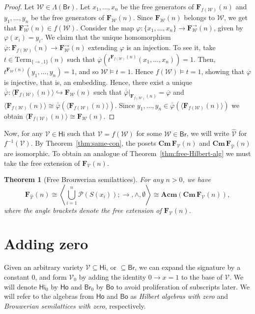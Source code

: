 \documentclass{amsart}
\newtheorem{theorem}{Theorem}[section]
\newcommand{\alg}[1]{\mathbf{#1}}
\newcommand{\var}[1]{\mathsf{#1}}
\newcommand{\FV}{\alg{F}_\mathcal{V}}
\newcommand{\FW}{\alg{F}_\mathcal{W}}
\newcommand{\FVhat}{\alg{F}_{\widehat{\mathcal{V}}}}
\newcommand{\Cm}[1]{\mathbf{Cm}\, #1}
\def\ra{\rightarrow}
\def\pw{\mathscr{P}}
\begin{document}
\begin{proof}
Let $\mathcal{W}\in\Lambda(\var{Br})$. Let $x_1,\dots,x_n$ be the free
generators of $\alg{F}_{f(\mathcal{W})}(n)$ and $y_1,\dots,y_n$ be the free
generators of $\FW(n)$. Since $\FW(n)$ belongs to
$\mathcal{W}$, we get that $\FW^\ra(n)\in f(\mathcal{W})$.
Consider the map
$\varphi\colon \{x_1,\dots,x_n\}\to \FW^\ra(n)$, given by
$\varphi(x_i) = y_i$. We claim that the unique homomorphism
$\overline{\varphi}\colon \alg{F}_{f(\mathcal{W})}(n)\to \FW^\ra(n)$ extending
$\varphi$ is an injection. To see it, take $t\in \mathrm{Term}_{\{\ra,1\}}(n)$
such that $\overline{\varphi}(t^{\alg{F}_{f(\mathcal{W})}(n)}(x_1,\dots,x_n)) = 1$.
Then, $t^{\FW(n)}(y_1,\dots,y_n) = 1$, and so
$\mathcal{W}\models t =1$. Hence $f(\mathcal{W})\models t =1$, showing
that $\overline{\varphi}$ is injective, that is, an embedding.
Hence, there exist a unique
$\overline{\overline{\varphi}}\colon
\langle \alg{F}_{f(\mathcal{W})}(n) \rangle \hookrightarrow \FW(n)$
such that $\overline{\overline{\varphi}}|_{\alg{F}_{f(\mathcal{W})}(n)} =
\overline{\varphi}$ and
$\langle \alg{F}_{f(\mathcal{W})}(n) \rangle \cong
\overline{\overline{\varphi}}(\langle \alg{F}_{f(\mathcal{W})}(n) \rangle)$.
Since $y_1,\dots, y_n\in \overline{\overline{\varphi}}(\langle
\alg{F}_{f(\mathcal{W})}(n) \rangle)$ we obtain
$\langle \alg{F}_{f(\mathcal{W})}(n)\rangle \cong
\FW(n)$. 
\end{proof}  


Now, for any $\mathcal{V}\in\var{Hi}$ such that
$\mathcal{V} = f(\mathcal{W})$ for some $\mathcal{W}\in\var{Br}$,
we will write $\widehat{\mathcal{V}}$ for $f^{-1}(\mathcal{V})$. 
By Theorem~\ref{thm:same-con}, the posets $\Cm{\FV(n)}$
and $\Cm{\FVhat(n)}$ are isomorphic. To obtain an analogue
of Theorem~\ref{thm:free-Hilbert-alg} we must take the free extension
of $\FV(n)$. 


\begin{theorem}[Free Brouwerian semilattices]\label{thm:free-Br-semi}
For any $n > 0$, we have
$$
\FVhat(n)\cong
\left\langle\bigcup_{i=1}^n\pw(S(x_i));\ra,\wedge,\emptyset\right\rangle 
\cong \alg{Acm}(\Cm{\FV(n)}),
$$
where the angle brackets denote the free extension of\/
$\FV(n)$.
\end{theorem}



\section{Adding zero}\label{sec:zero}
Given an arbitrary
variety $\mathcal{V}\subseteq\var{Hi}$, or $\subseteq\var{Br}$,
we can expand the signature by a constant
$0$, and form $\mathcal{V}_0$ by adding the identity $0\ra x = 1$ to the base of
$\mathcal{V}$. We will denote $\var{Hi}_0$ by $\var{Ho}$ and
$\var{Br}_0$ by $\var{Bo}$ to avoid proliferation of subscripts later.  
We will refer to the algebras from $\var{Ho}$ and $\var{Bo}$ 
as \emph{Hilbert algebras with zero} and
\emph{Brouwerian semilattices with zero}, respectively. 
\end{document}
